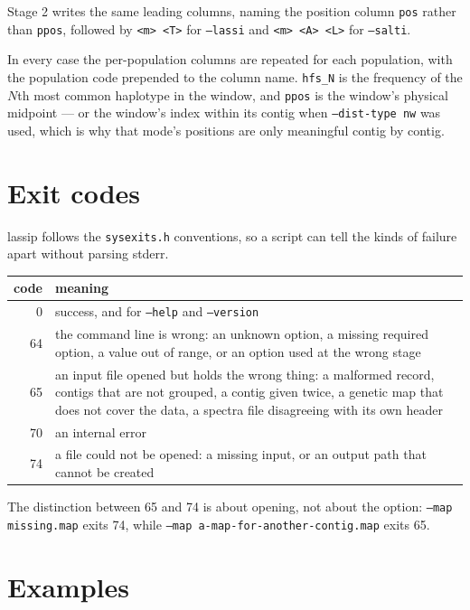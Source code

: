 \documentclass[11pt]{article}
\newcommand{\opt}[1]{\texttt{#1}}
\begin{document}
Stage 2 writes the same leading columns, naming the position column
\texttt{pos} rather than \texttt{ppos}, followed by \texttt{<m> <T>} for
\opt{--lassi} and \texttt{<m> <A> <L>} for \opt{--salti}.

In every case the per-population columns are repeated for each population, with
the population code prepended to the column name. \texttt{hfs\_N} is the
frequency of the $N$th most common haplotype in the window, and \texttt{ppos}
is the window's physical midpoint --- or the window's index within its contig
when \opt{--dist-type nw} was used, which is why that mode's positions are only
meaningful contig by contig.

\section{Exit codes}

lassip follows the \texttt{sysexits.h} conventions, so a script can tell the
kinds of failure apart without parsing stderr.

\begin{center}
\begin{tabular}{@{}rp{}@{}}
\toprule
code & meaning \\
\midrule
0  & success, and for \opt{--help} and \opt{--version} \\
64 & the command line is wrong: an unknown option, a missing required option,
     a value out of range, or an option used at the wrong stage \\
65 & an input file opened but holds the wrong thing: a malformed record,
     contigs that are not grouped, a contig given twice, a genetic map that
     does not cover the data, a spectra file disagreeing with its own header \\
70 & an internal error \\
74 & a file could not be opened: a missing input, or an output path that cannot
     be created \\
\bottomrule
\end{tabular}
\end{center}

The distinction between 65 and 74 is about opening, not about the option:
\opt{--map missing.map} exits 74, while
\opt{--map a-map-for-another-contig.map} exits 65.

\section{Examples}
\end{document}

